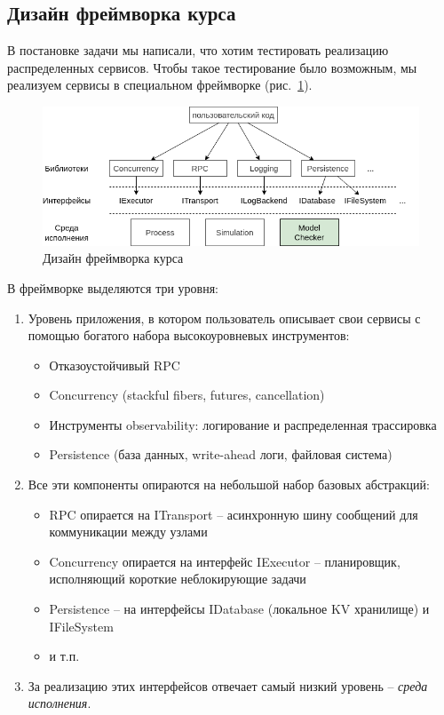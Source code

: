 \subsection{Дизайн фреймворка курса}

В постановке задачи мы написали, что хотим тестировать реализацию распределенных сервисов. Чтобы такое тестирование было возможным, мы реализуем сервисы в специальном фреймворке (рис.~\ref{fig:runtime}).

\begin{figure}[h]
    \centering
    \includegraphics[width=\textwidth]{img/runtime.png}
    \caption{Дизайн фреймворка курса}
    \label{fig:runtime}
\end{figure}

В фреймворке выделяются три уровня:

\begin{enumerate}
    \item Уровень приложения, в котором пользователь описывает свои сервисы с помощью богатого набора высокоуровневых инструментов:
    \begin{itemize}
        \item Отказоустойчивый RPC 
        \item Concurrency (stackful fibers, futures, cancellation)
        \item Инструменты observability: логирование и распределенная трассировка
        \item Persistence (база данных, write-ahead логи, файловая система)
    \end{itemize}
    
    \item Все эти компоненты опираются на небольшой набор базовых абстракций:
    \begin{itemize}
        \item RPC опирается на ITransport – асинхронную шину сообщений для коммуникации между узлами
        \item Concurrency опирается на интерфейс IExecutor – планировщик, исполняющий короткие неблокирующие задачи
        \item Persistence – на интерфейсы IDatabase (локальное KV хранилище) и IFileSystem
        \item и т.п.
    \end{itemize}
    
    \item За реализацию этих интерфейсов отвечает самый низкий уровень – \emph{среда исполнения}.
\end{enumerate}

